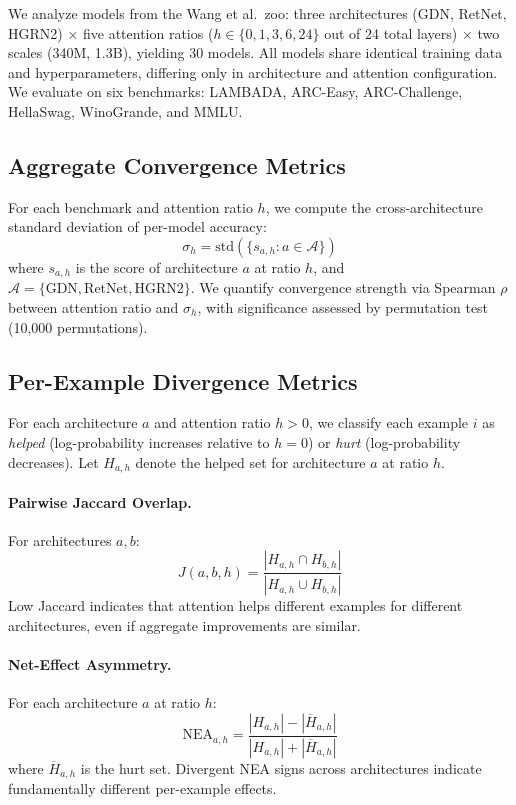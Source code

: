 \documentclass[11pt,a4paper]{article}
\begin{document}
We analyze models from the Wang et al.\ zoo: three architectures (GDN, RetNet, HGRN2) $\times$ five attention ratios ($h \in \{0, 1, 3, 6, 24\}$ out of 24 total layers) $\times$ two scales (340M, 1.3B), yielding 30 models.
All models share identical training data and hyperparameters, differing only in architecture and attention configuration.
We evaluate on six benchmarks: LAMBADA, ARC-Easy, ARC-Challenge, HellaSwag, WinoGrande, and MMLU.

\subsection{Aggregate Convergence Metrics}

For each benchmark and attention ratio $h$, we compute the cross-architecture standard deviation of per-model accuracy:
\begin{equation}
    \sigma_h = \text{std}(\{s_{a,h} : a \in \mathcal{A}\})
\end{equation}
where $s_{a,h}$ is the score of architecture $a$ at ratio $h$, and $\mathcal{A} = \{\text{GDN}, \text{RetNet}, \text{HGRN2}\}$.
We quantify convergence strength via Spearman $\rho$ between attention ratio and $\sigma_h$, with significance assessed by permutation test (10,000 permutations).

\subsection{Per-Example Divergence Metrics}
\label{sec:per-example-metrics}

For each architecture $a$ and attention ratio $h > 0$, we classify each example $i$ as \emph{helped} (log-probability increases relative to $h=0$) or \emph{hurt} (log-probability decreases).
Let $H_{a,h}$ denote the helped set for architecture $a$ at ratio $h$.

\paragraph{Pairwise Jaccard Overlap.}
For architectures $a, b$:
\begin{equation}
    J(a, b, h) = \frac{|H_{a,h} \cap H_{b,h}|}{|H_{a,h} \cup H_{b,h}|}
\end{equation}
Low Jaccard indicates that attention helps different examples for different architectures, even if aggregate improvements are similar.

\paragraph{Net-Effect Asymmetry.}
For each architecture $a$ at ratio $h$:
\begin{equation}
    \text{NEA}_{a,h} = \frac{|H_{a,h}| - |\overline{H}_{a,h}|}{|H_{a,h}| + |\overline{H}_{a,h}|}
\end{equation}
where $\overline{H}_{a,h}$ is the hurt set.
Divergent NEA signs across architectures indicate fundamentally different per-example effects.
\end{document}
